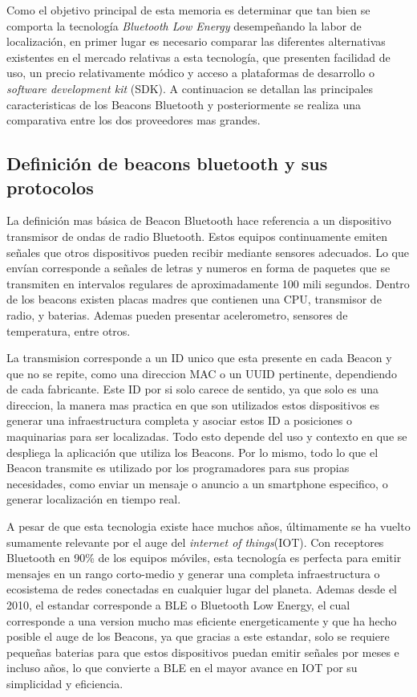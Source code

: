 Como el objetivo principal de esta memoria es determinar que tan bien se comporta la tecnología \textit{Bluetooth Low Energy} desempeñando la labor de localización, en primer lugar es necesario comparar las diferentes alternativas existentes en el mercado relativas a esta tecnología, que presenten facilidad de uso, un precio relativamente módico y acceso a plataformas de desarrollo o \textit{software development kit} (SDK). A continuacion se detallan las principales caracteristicas de los Beacons Bluetooth y posteriormente se realiza una comparativa entre los dos proveedores mas grandes.

\subsection{Definición de beacons bluetooth y sus protocolos}

La definición mas básica de Beacon Bluetooth hace referencia a un dispositivo transmisor de ondas de radio Bluetooth. Estos equipos continuamente emiten señales que otros dispositivos pueden recibir mediante sensores adecuados. Lo que envían corresponde a señales de letras y numeros en forma de paquetes que se transmiten en intervalos regulares de aproximadamente 100 mili segundos. Dentro de los beacons existen placas madres que contienen una CPU, transmisor de radio, y baterias. Ademas pueden presentar acelerometro, sensores de temperatura, entre otros.

La transmision corresponde a un ID unico que esta presente en cada Beacon y que no se repite, como una direccion MAC o un UUID pertinente, dependiendo de cada fabricante. Este ID por si solo carece de sentido, ya que solo es una direccion, la manera mas practica en que son utilizados estos dispositivos es generar una infraestructura completa y asociar estos ID a posiciones o maquinarias para ser localizadas. Todo esto depende del uso y contexto en que se despliega la aplicación que utiliza los Beacons. Por lo mismo, todo lo que el Beacon transmite es utilizado por los programadores para sus propias necesidades, como enviar un mensaje o anuncio a un smartphone especifico, o generar localización en tiempo real.

A pesar de que esta tecnologia existe hace muchos años, últimamente se ha vuelto sumamente relevante por el auge del \textit{internet of things}(IOT). Con receptores Bluetooth en 90\% de los equipos móviles, esta tecnología es perfecta para emitir mensajes en un rango corto-medio y generar una completa infraestructura o ecosistema de redes conectadas en cualquier lugar del planeta. Ademas desde el 2010, el estandar corresponde a BLE o Bluetooth Low Energy, el cual corresponde a una version mucho mas eficiente energeticamente y que ha hecho posible el auge de los Beacons, ya que gracias a este estandar, solo se requiere pequeñas baterias para que estos dispositivos puedan emitir señales por meses e incluso años, lo que convierte a BLE en el mayor avance en IOT por su simplicidad y eficiencia.

